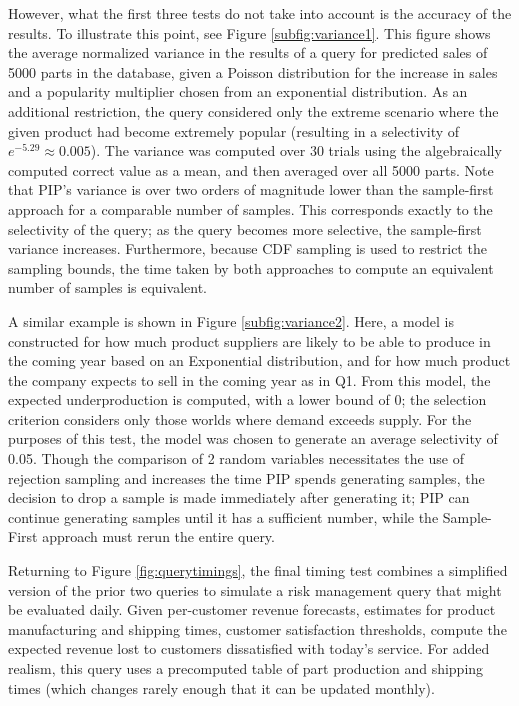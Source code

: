 However, what the first three tests do not take into account is the accuracy of the results.  To illustrate this point, see Figure \ref{subfig:variance1}.  This figure shows the average normalized variance in the results of a query for predicted sales of 5000 parts in the database, given a Poisson distribution for the increase in sales and a popularity multiplier chosen from an exponential distribution.  As an additional restriction, the query considered only the extreme scenario where the given product had become extremely popular (resulting in a selectivity of $e^{-5.29} \approx 0.005$).  The variance was computed over 30 trials using the algebraically computed correct value as a mean, and then averaged over all 5000 parts.  Note that PIP's variance is over two orders of magnitude lower than the sample-first approach for a comparable number of samples.  This corresponds exactly to the selectivity of the query; as the query becomes more selective, the sample-first variance increases.  Furthermore, because CDF sampling is used to restrict the sampling bounds, the time taken by both approaches to compute an equivalent number of samples is equivalent.

A similar example is shown in Figure \ref{subfig:variance2}.  Here, a model is constructed for how much product suppliers are likely to be able to produce in the coming year based on an Exponential distribution, and for how much product the company expects to sell in the coming year as in Q1.  From this model, the expected underproduction is computed, with a lower bound of 0; the selection criterion considers only those worlds where demand exceeds supply.  For the purposes of this test, the model was chosen to generate an average selectivity of 0.05.  Though the comparison of 2 random variables necessitates the use of rejection sampling and increases the time PIP spends generating samples, the decision to drop a sample is made immediately after generating it; PIP can continue generating samples until it has a sufficient number, while the Sample-First approach must rerun the entire query.

Returning to Figure \ref{fig:querytimings}, the final timing test combines a simplified version of the prior two queries to simulate a risk management query that might be evaluated daily.  Given per-customer revenue forecasts, estimates for product manufacturing and shipping times, customer satisfaction thresholds, compute the expected revenue lost to customers dissatisfied with today's service.  For added realism, this query uses a precomputed table of part production and shipping times (which changes rarely enough that it can be updated monthly).  %

